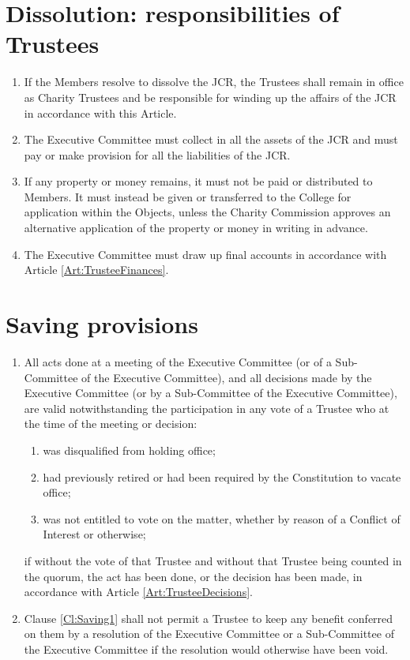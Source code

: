 \documentclass[11pt,a4paper, oneside]{memoir}
\begin{document}
	\section{Dissolution: responsibilities of Trustees}
	\begin{enumerate}
		\item If the Members resolve to dissolve the JCR, the Trustees shall remain in office as Charity Trustees and be responsible for winding up the affairs of the JCR in accordance with this Article.
		\item The Executive Committee must collect in all the assets of the JCR and must pay or make provision for all the liabilities of the JCR.
		\item If any property or money remains, it must not be paid or distributed to Members.  It must instead be given or transferred to the College for application within the Objects, unless the Charity Commission approves an alternative application of the property or money in writing in advance.
		\item The Executive Committee must draw up final accounts in accordance with Article \ref{Art:TrusteeFinances}.
	\end{enumerate}
	\section{Saving provisions}
	\begin{enumerate}
		\item \label{Cl:Saving1}All acts done at a meeting of the Executive Committee (or of a Sub-Committee of the Executive Committee), and all decisions made by the Executive Committee (or by a Sub-Committee of the Executive Committee), are valid notwithstanding the participation in any vote of a Trustee who at the time of the meeting or decision:
		\begin{enumerate}
			\item was disqualified from holding office;
			\item had previously retired or had been required by the Constitution to vacate office;
			\item was not entitled to vote on the matter, whether by reason of a Conflict of Interest or otherwise;
		\end{enumerate}
		if without the vote of that Trustee and without that Trustee being counted in the quorum, the act has been done, or the decision has been made, in accordance with Article \ref{Art:TrusteeDecisions}.
		\item Clause \ref{Cl:Saving1} shall not permit a Trustee to keep any benefit conferred on them by a resolution of the Executive Committee or a Sub-Committee of the Executive Committee if the resolution would otherwise have been void.
	\end{enumerate}
\end{document}
